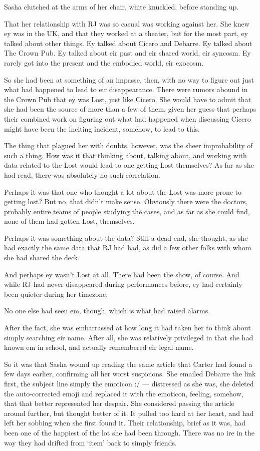 Sasha clutched at the arms of her chair, white knuckled, before standing up.

That her relationship with RJ was so casual was working against her. She knew ey was in the UK, and that they worked at a theater, but for the most part, ey talked about other things. Ey talked about Cicero and Debarre. Ey talked about The Crown Pub. Ey talked about eir past and eir shared world, eir syncosm. Ey rarely got into the present and the embodied world, eir exocosm.

So she had been at something of an impasse, then, with no way to figure out just what had happened to lead to eir disappearance. There were rumors abound in the Crown Pub that ey was Lost, just like Cicero. She would have to admit that she had been the source of more than a few of them, given her guess that perhaps their combined work on figuring out what had happened when discussing Cicero might have been the inciting incident, somehow, to lead to this.

The thing that plagued her with doubts, however, was the sheer improbability of such a thing. How was it that thinking about, talking about, and working with data related to the Lost would lead to one getting Lost themselves? As far as she had read, there was absolutely no such correlation.

Perhaps it was that one who thought a lot about the Lost was more prone to getting lost? But no, that didn't make sense. Obviously there were the doctors, probably entire teams of people studying the cases, and as far as she could find, none of them had gotten Lost, themselves.

Perhaps it was something about the data? Still a dead end, she thought, as she had exactly the same data that RJ had had, as did a few other folks with whom she had shared the deck.

And perhaps ey wasn't Lost at all. There had been the show, of course. And while RJ had never disappeared during performances before, ey had certainly been quieter during her timezone.

No one else had seen em, though, which is what had raised alarms.

After the fact, she was embarrassed at how long it had taken her to think about simply searching eir name. After all, she was relatively privileged in that she had known em in school, and actually remembered eir legal name.

So it was that Sasha wound up reading the same article that Carter had found a few days earlier, confirming all her worst suspicions. She emailed Debarre the link first, the subject line simply the emoticon :/ --- distressed as she was, she deleted the auto-corrected emoji and replaced it with the emoticon, feeling, somehow, that that better represented her despair. She considered passing the article around further, but thought better of it. It pulled too hard at her heart, and had left her sobbing when she first found it. Their relationship, brief as it was, had been one of the happiest of the lot she had been through. There was no ire in the way they had drifted from `item' back to simply friends.

